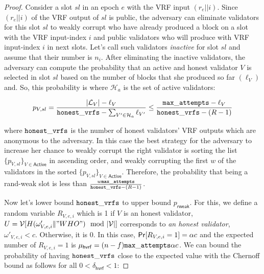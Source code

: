 \begin{proof}
	Consider a slot $ sl $ in an epoch $ e $ with the VRF input $ (r_e||i) $. Since $ (r_e||i) $ of the VRF output of $ sl $ is public, the adversary can eliminate validators for this slot $ sl $ to weakly corrupt who have already produced a block on a slot with the VRF input-index $ i $ and public validators who will produce with VRF input-index $ i $ in next slots. Let's call such validators \emph{inactive} for slot $ sl $ and assume that their number is $ n_i $. After eliminating the inactive validators, the adversary can compute the probability that an active  and honest validator $ V $ is selected in slot $ sl $ based on the number of blocks that she produced so far $ (\ell_V) $ and. So, this probability is where $ \mathcal{H}_a $ is the set of active validators:
	
	
	\begin{equation}\label{eq:prVs}
	p_{V,sl} = \frac{|\mathcal{L}_V|- \ell_V}{\mathtt{honest\_vrfs} - \sum_{V' \in \mathcal{H}_a}\ell_{V'}}\leq \frac{\mathtt{max\_attempts} - \ell_V}{\mathtt{honest\_vrfs} - (R-1)}
	\end{equation}
	
	
	where $ \mathtt{honest\_vrfs} $ is the number of honest validators' VRF outputs which are anonymous to the adversary.
	In this case the best strategy for the adversary to increase her chance to  weakly corrupt the right validator  is sorting the list $ \{p_{V,sl}\}_{V \in \mathsf{Active}} $ in ascending order, and weakly corrupting the first $ w $ of the validators in the sorted $ \{p_{V,sl}\}_{V \in \mathsf{Active}} $. Therefore, the probability that being a rand-weak slot is less than $  \frac{w\mathtt{max\_attempts} }{\mathtt{honest\_vrfs} - (R-1)}  $.
	
	Now let's lower bound $ \mathtt{honest\_vrfs} $ to upper bound $ p_{\mathsf{rweak}} $.	For this, we define a random variable $ R_{V,e,i} $ which is 1 if $ V $ is an honest validator, $ U = \mathcal{V}[H(\omega'_{V,e,i} \| "WHO") \mod |\mathcal{V}|]  $ corresponds to  \emph{an honest validator}, $ \omega'_{V,e,i} < c $. Otherwise, it is 0.  In this case, $ \mathsf{Pr}[R_{V,e,i} = 1] = \alpha c$ and
	the expected number of $ R_{V,e,i}  = 1$ is  $ \mu_{\mathsf{hvrf}} = (n-f) \mathtt{max\_attempts} \alpha c $. We can bound the probability of having $ \mathtt{honest\_vrfs} $ close to the expected value with  the Chernoff bound as follows for all $ 0 <\delta_{\mathsf{hvrf}} < 1 	 $:
	

\end{proof}
